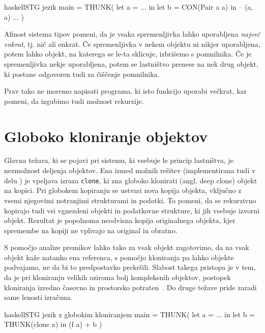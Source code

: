 \begin{code-box}{haskell}{STG jezik \xmark}
main = THUNK(
    let a = ... in
    let b = CON(Pair a a) in -- (a, a)
        ...
)
\end{code-box}

Afinost sistema tipov pomeni, da je vsaka spremenljivka lahko uporabljena \emph{največ enkrat}, tj. nič ali enkrat. Če spremenljivka v nekem objektu ni nikjer uporabljena, potem lahko objekt, na katerega se le-ta sklicuje, izbrišemo s pomnilnika. Če je spremenljivka nekje uporabljena, potem se lastništvo prenese na nek drug objekt, ki postane odgovoren tudi za čiščenje pomnilnika.

Prav tako ne moremo napisati programa, ki isto funkcijo uporabi večkrat, kar pomeni, da izgubimo tudi možnost rekurzije.


\section{Globoko kloniranje objektov}

Glavna težava, ki se pojavi pri sistemu, ki vsebuje le princip lastništva, je nezmožnost deljenja objektov. Ena izmed možnih rešitev (implementirana tudi v delu \cite{marshall2024functional}) je vpeljava izraza \texttt{clone}, ki zna globoko klonirati (angl. deep clone) objekt na kopici. Pri globokem kopiranju se ustvari nova kopija objekta, vključno z vsemi njegovimi notranjimi strukturami in podatki. To pomeni, da se rekurzivno kopirajo tudi vsi vgnezdeni objekti in podatkovne strukture, ki jih vsebuje izvorni objekt. Rezultat je popolnoma neodvisna kopija originalnega objekta, kjer spremembe na kopiji ne vplivajo na original in obratno.

S pomočjo analize premikov lahko tako za vsak objekt zagotovimo, da na vsak objekt kaže natanko ena referenca, s pomočjo kloniranja pa lahko objekte podvajamo, ne da bi to predpostavko prekršili. Slabost takega pristopa je v tem, da je pri kloniranju velikih oziroma bolj kompleksnih objektov, postopek kloniranja izredno časovno in prostorsko potraten~\cite{wadler1990linear, lafont1988linear}. Do druge težave pride zaradi same lenosti izračuna.

\begin{code-box}{haskell}{STG jezik z globokim kloniranjem \xmark}
main = THUNK(
    let a = ... in
    let b = THUNK(clone a) in
        (f a) + b
)
\end{code-box}


